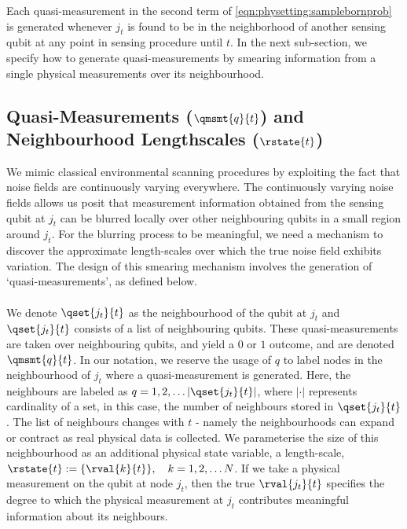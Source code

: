 Each quasi-measurement in the second term of \cref{eqn:physetting:samplebornprob} is generated whenever $j_t$ is found to be in the neighborhood of another sensing qubit at any point in sensing procedure until $t$. In the next sub-section, we specify how to generate quasi-measurements by smearing information from a single physical measurements over its neighbourhood. 

\subsection{Quasi-Measurements ($\qmsmt{q}{t}$) and Neighbourhood Lengthscales ($\rstate{t}$)}

We mimic classical environmental scanning procedures by exploiting the fact that noise fields are continuously varying everywhere. The continuously varying noise fields allows us posit that  measurement information obtained from the sensing qubit at $j_t$ can be blurred locally over other neighbouring qubits in a small region around $j_t$. For the blurring process to be meaningful, we need a mechanism to discover the approximate length-scales over which the true noise field exhibits variation. The design of this smearing mechanism involves the generation of `quasi-measurements', as defined below.\\
\\
We denote $\qset{j_t}{t}$ as the neighbourhood of the qubit at $j_t$ and $\qset{j_t}{t}$ consists of a list of neighbouring qubits. These quasi-measurements are taken over neighbouring qubits, and yield a $0$ or $1$ outcome, and are denoted $\qmsmt{q}{t}$. In our notation, we reserve the usage of $q$ to label nodes in the neighbourhood of $j_t$ where a quasi-measurement is generated. Here, the neighbours are labeled as $q = 1, 2, \hdots |\qset{j_t}{t}|$, where $|\cdot|$ represents cardinality of a set, in this case, the number of neighbours stored in $\qset{j_t}{t}$. The list of neighbours changes with $t$ - namely the neighbourhoods can expand or contract as real physical data is collected. We parameterise the size of this neighbourhood as an additional physical state variable, a length-scale, $\rstate{t}:= \{\rval{k}{t}\}, \quad  k= 1, 2, \hdots N $. If we take a physical measurement on the qubit at node $j_t$, then the true $\rval{j_t}{t}$ specifies the degree to which the physical measurement at $j_t$ contributes meaningful information about its neighbours. \\
\\
